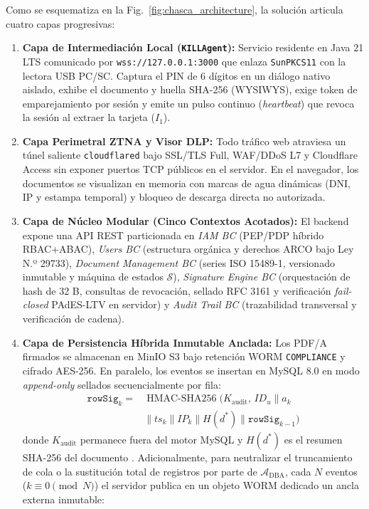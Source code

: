 \documentclass[runningheads,twocolumn]{llncs}
\begin{document}
Como se esquematiza en la Fig.~\ref{fig:chasca_architecture}, la solución articula cuatro capas progresivas:
\begin{enumerate}
    \item \textbf{Capa de Intermediación Local (\texttt{KILLAgent}):} Servicio residente en Java 21 LTS comunicado por \texttt{wss://127.0.0.1:3000} que enlaza \texttt{SunPKCS11} con la lectora USB PC/SC. Captura el PIN de 6 dígitos en un diálogo nativo aislado, exhibe el documento y huella SHA-256 (WYSIWYS), exige token de emparejamiento por sesión y emite un pulso continuo (\textit{heartbeat}) que revoca la sesión al extraer la tarjeta ($I_1$).
    \item \textbf{Capa Perimetral ZTNA y Visor DLP:} Todo tráfico web atraviesa un túnel saliente \texttt{cloudflared} bajo SSL/TLS Full, WAF/DDoS L7 y Cloudflare Access sin exponer puertos TCP públicos en el servidor. En el navegador, los documentos se visualizan en memoria con marcas de agua dinámicas (DNI, IP y estampa temporal) y bloqueo de descarga directa no autorizada.
    \item \textbf{Capa de Núcleo Modular (Cinco Contextos Acotados):} El backend expone una API REST particionada en \textit{IAM BC} (PEP/PDP híbrido RBAC+ABAC), \textit{Users BC} (estructura orgánica y derechos ARCO bajo Ley N.º 29733), \textit{Document Management BC} (series ISO 15489-1, versionado inmutable y máquina de estados $\mathcal{S}$), \textit{Signature Engine BC} (orquestación de hash de 32 B, consultas de revocación, sellado RFC 3161 y verificación \textit{fail-closed} PAdES-LTV en servidor) y \textit{Audit Trail BC} (trazabilidad transversal y verificación de cadena).
    \item \textbf{Capa de Persistencia Híbrida Inmutable Anclada:} Los PDF/A firmados se almacenan en MinIO S3 bajo retención WORM \texttt{COMPLIANCE} y cifrado AES-256. En paralelo, los eventos se insertan en MySQL 8.0 en modo \textit{append-only} sellados secuencialmente por fila:
    \begin{equation}
    \begin{aligned}
        \texttt{rowSig}_k ={}& \operatorname{HMAC\text{-}SHA256}\big(K_{\text{audit}},\, ID_u \parallel a_k \\
        &\parallel ts_k \parallel IP_k \parallel H(d^*) \parallel \texttt{rowSig}_{k-1}\big)
    \end{aligned}
    \label{eq:row_signature}
    \end{equation}
    donde $K_{\text{audit}}$ permanece fuera del motor MySQL y $H(d^*)$ es el resumen SHA-256 del documento \cite{soni2026}. Adicionalmente, para neutralizar el truncamiento de cola o la sustitución total de registros por parte de $\mathcal{A}_{\text{DBA}}$, cada $N$ eventos ($k \equiv 0 \pmod N$) el servidor publica en un objeto WORM dedicado un ancla externa inmutable:

\end{enumerate}
\end{document}
